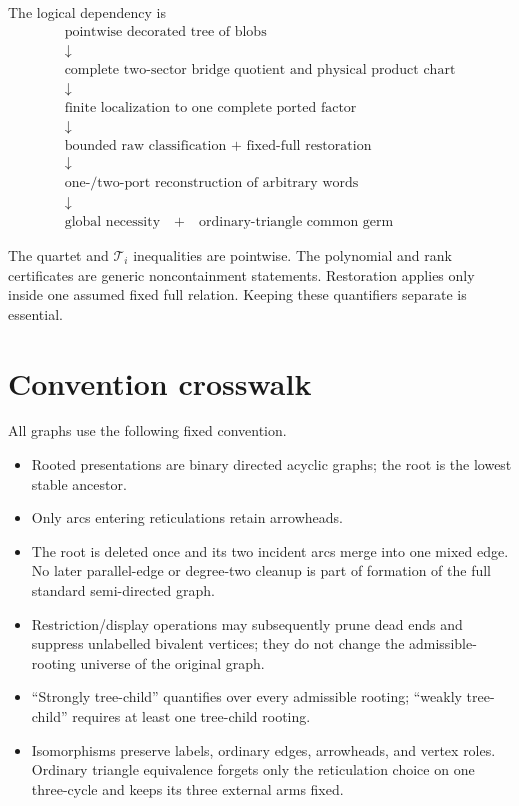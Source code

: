 \documentclass[11pt]{article}
\theoremstyle{remark}
\newcommand{\Ti}{\mathcal T_i}
\begin{document}
The logical dependency is
\[
\begin{array}{c}
\text{pointwise decorated tree of blobs}\\
\downarrow\\
\text{complete two-sector bridge quotient and physical product chart}\\
\downarrow\\
\text{finite localization to one complete ported factor}\\
\downarrow\\
\text{bounded raw classification + fixed-full restoration}\\
\downarrow\\
\text{one-/two-port reconstruction of arbitrary words}\\
\downarrow\\
\text{global necessity}\quad+\quad\text{ordinary-triangle common germ}
\end{array}
\]

The quartet and \(\Ti\) inequalities are pointwise.  The polynomial and rank
certificates are generic noncontainment statements.  Restoration applies only
inside one assumed fixed full relation.  Keeping these quantifiers separate
is essential.

\section{Convention crosswalk}\label{sec:conventions}

All graphs use the following fixed convention.
\begin{itemize}
  \item Rooted presentations are binary directed acyclic graphs; the root is
        the lowest stable ancestor.
  \item Only arcs entering reticulations retain arrowheads.
  \item The root is deleted once and its two incident arcs merge into one
        mixed edge.  No later parallel-edge or degree-two cleanup is part of
        formation of the full standard semi-directed graph.
  \item Restriction/display operations may subsequently prune dead ends and
        suppress unlabelled bivalent vertices; they do not change the
        admissible-rooting universe of the original graph.
  \item ``Strongly tree-child'' quantifies over every admissible rooting;
        ``weakly tree-child'' requires at least one tree-child rooting.
  \item Isomorphisms preserve labels, ordinary edges, arrowheads, and vertex
        roles.  Ordinary triangle equivalence forgets only the reticulation
        choice on one three-cycle and keeps its three external arms fixed.
\end{itemize}
\end{document}
